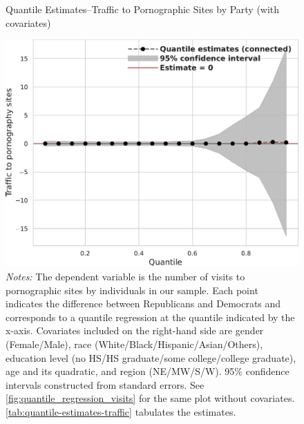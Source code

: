 \documentclass[12pt, letterpaper]{article}
\begin{document}
\begin{figure}
	\centering
	\caption{Quantile Estimates--Traffic to Pornographic Sites by Party (with covariates)}
	\includegraphics[width=.55\linewidth]{figs/quantile_reg_covariates_visits_adult.pdf}
	\caption*{\footnotesize \emph{Notes:} 
		The dependent variable is the number of visits to pornographic sites by individuals in our sample.
		Each point indicates the difference between Republicans and Democrats and corresponds to a quantile regression at the quantile indicated by the x-axis.
		Covariates included on the right-hand side are gender (Female/Male), race (White/Black/Hispanic/Asian/Others), education level (no HS/HS graduate/some college/college graduate), age and its quadratic, and region (NE/MW/S/W).
		95\% confidence intervals constructed from standard errors.
		See \cref{fig:quantile_regression_visits} for the same plot without covariates.
            \cref{tab:quantile-estimates-traffic} tabulates the estimates.
	}
	\label{fig:quantile_regression_visits_covariates}
\end{figure}
\end{document}
